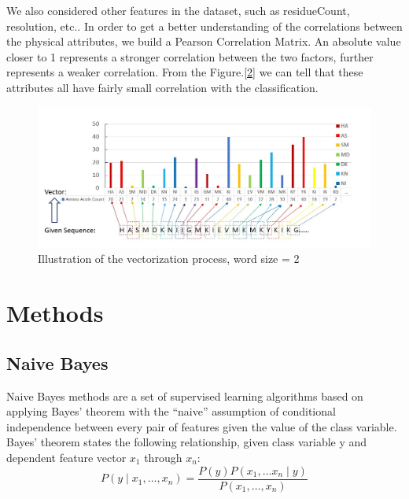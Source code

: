 \documentclass[sigconf]{acmart}
\begin{document}
We also considered other features in the dataset, such as residueCount, resolution, etc.. In order to get a better understanding of the correlations between the physical attributes, we build a Pearson Correlation Matrix. An absolute value closer to 1 represents a stronger correlation between the two factors, further represents a weaker correlation. From the Figure.\ref{2} we can tell that these attributes all have fairly small correlation with the classification.

\begin{figure}
  \centering
  \includegraphics[width=\linewidth]{1.jpeg}
  \caption{Illustration of the vectorization process, word size = 2}
  \label{1}
\end{figure}

\section{Methods}
\subsection{Naive Bayes}
Naive Bayes methods are a set of supervised learning algorithms based on applying Bayes’ theorem with the “naive” assumption of conditional independence between every pair of features given the value of the class variable\cite{patil2013performance}. Bayes’ theorem states the following relationship, given class variable y and dependent feature vector $x_1$ through $x_n$:
\begin{equation}
    P(y \mid x_1, \dots, x_n) = \frac{P(y) P(x_1, \dots x_n \mid y)}{P(x_1, \dots, x_n)}
\end{equation}
\end{document}
